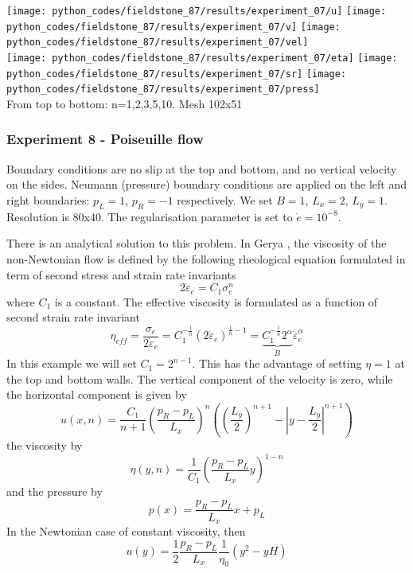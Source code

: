 \begin{center}
\texttt{[image: python\_codes/fieldstone\_87/results/experiment\_07/u]}
\texttt{[image: python\_codes/fieldstone\_87/results/experiment\_07/v]}
\texttt{[image: python\_codes/fieldstone\_87/results/experiment\_07/vel]}\\
\texttt{[image: python\_codes/fieldstone\_87/results/experiment\_07/eta]}
\texttt{[image: python\_codes/fieldstone\_87/results/experiment\_07/sr]}
\texttt{[image: python\_codes/fieldstone\_87/results/experiment\_07/press]}\\
{\captionfont From top to bottom: n=1,2,3,5,10. Mesh 102x51}
\end{center}





\newpage
\subsubsection*{Experiment 8 - Poiseuille flow}

Boundary conditions are no slip at the top and bottom, and no vertical 
velocity on the sides.
Neumann (pressure) boundary conditions are applied on the 
left and right boundaries: $p_L=1$, $p_R=-1$ respectively.
We set $B=1$, $L_x=2$, $L_y=1$. 
Resolution is 80x40. The regularisation parameter is set to $\dot{e}=10^{-8}$.

There is an analytical solution to this problem. 
In Gerya \cite{gery19}, the viscosity of the non-Newtonian flow is defined by the following rheological
equation formulated in term of second stress and strain rate invariants
\[
2 \dot\varepsilon_e = C_1 \sigma_e^n
\]
where $C_1$ is a constant. The effective viscosity is formulated 
as a function of second strain rate invariant
\[
\eta_{eff} = \frac{\sigma_e}{2\dot\varepsilon_e} 
= C_1^{-\frac1n} (2 \dot\varepsilon_e)^{\frac1n-1}
= \underbrace{C_1^{-\frac1n} 2^\alpha}_{B}  \dot\varepsilon_e^{\alpha}
\]
In this example we will set $C_1=2^{n-1}$. This has the advantage of setting $\eta=1$ at 
the top and bottom walls. The vertical component 
of the velocity is zero, while the horizontal component is 
given by 
\[
u(x,n)=\frac{C_1}{n+1} \left(\frac{p_R-p_L}{L_x}\right)^n  
\left(  \left(\frac{L_y}{2}\right)^{n+1} - \left| y -\frac{L_y}{2}\right|^{n+1} \right)
\]
the viscosity by
\[
\eta(y,n)=\frac{1}{C_1} \left( \frac{p_R-p_L}{L_x} y \right)^{1-n}
\]
and the pressure by 
\[
p(x)=\frac{p_R-p_L}{L_x}x+p_L
\]
In the Newtonian case of constant viscosity, then 
\[
u(y) = \frac{1}{2} \frac{p_R-p_L}{L_x } \frac{1}{\eta_0} (y^2-yH)
\]

